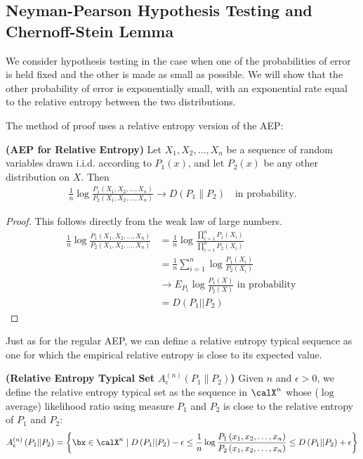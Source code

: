 \documentclass{article}
\newcommand{\bfs}[1]{\textbf{({#1})}}
\begin{document}
\subsection{Neyman-Pearson Hypothesis Testing and Chernoff-Stein Lemma}\label{ht:ssec3}

We consider hypothesis testing in the case when one of the probabilities of error is held fixed and the other is made as small as possible. We will show that the other probability of error is exponentially small, with an exponential rate equal to the relative entropy between the two distributions. 

The method of proof uses a relative entropy version of the AEP:

\begin{thma}{\bfs{AEP for Relative Entropy}}
 Let $X_{1}, X_{2}, \ldots, X_{n}$ be a sequence of random variables drawn i.i.d. according to $P_{1}(x)$, and let $P_{2}(x)$ be any other distribution on $X$. Then
 \begin{align*}
     \frac{1}{n} \log \frac{P_{1}\left(X_{1}, X_{2}, \ldots, X_{n}\right)}{P_{2}\left(X_{1}, X_{2}, \ldots, X_{n}\right)} \rightarrow D\left(P_{1} \| P_{2}\right) \quad \text{in probability}.
 \end{align*}

\end{thma}
\begin{proof}
This follows directly from the weak law of large numbers.
\begin{align*}
\frac{1}{n} \log \frac{P_{1}\left(X_{1}, X_{2}, \ldots, X_{n}\right)}{P_{2}\left(X_{1}, X_{2}, \ldots, X_{n}\right)}&=\frac{1}{n} \log \frac{\prod_{i=1}^{n} P_{1}\left(X_{i}\right)}{\prod_{i=1}^{n} P_{2}\left(X_{i}\right)}\\
&=\frac{1}{n} \sum_{i=1}^{n} \log \frac{P_{1}\left(X_{i}\right)}{P_{2}\left(X_{i}\right)} \\
&\rightarrow E_{P_{1}} \log \frac{P_{1}(X)}{P_{2}(X)} \text { in probability } \\
&=D\left(P_{1}|| P_{2}\right)
\end{align*}
\end{proof}


Just as for the regular AEP, we can define a relative entropy typical sequence as one for which the empirical relative entropy is close to its expected value.

\begin{defa}{\bfs{Relative Entropy Typical Set $A_{\epsilon}^{(n)}\left(P_{1} \| P_{2}\right)$}}
Given $n$ and $\epsilon>0$, we define the relative entropy typical set as the sequence in $\calX^n$ whose ($\log$ average) likelihood ratio using measure $P_1$ and $P_2$ is close to the relative entropy of $P_1$ and $P_2$:
$$
A_{\epsilon}^{(n)}\left(P_{1} \| P_{2}\right) = \left\{\bx\in \calX^n\mid D\left(P_{1}|| P_{2}\right)-\epsilon \leq \frac{1}{n} \log \frac{P_{1}\left(x_{1}, x_{2}, \ldots, x_{n}\right)}{P_{2}\left(x_{1}, x_{2}, \ldots, x_{n}\right)} \leq D\left(P_{1}|| P_{2}\right)+\epsilon\right\}
$$
\end{defa} 
\end{document}
